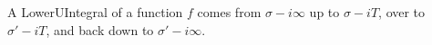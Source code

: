 \begin{definition}[LowerUIntegral]
\label{LowerUIntegral}
\leanok
A LowerUIntegral of a function $f$ comes from
  $\sigma-i\infty$ up to $\sigma-iT$, over to
  $\sigma'-iT$, and back down to $\sigma'-i\infty$.
\end{definition}

